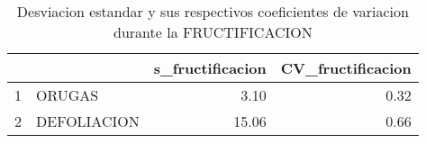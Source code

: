 \begin{table}[ht]
\centering
\begin{tabular}{rlrr}
  \hline
 &  & s\_fructificacion & CV\_fructificacion \\ 
  \hline
1 & ORUGAS & 3.10 & 0.32 \\ 
  2 & DEFOLIACION & 15.06 & 0.66 \\ 
   \hline
\end{tabular}
\caption{Desviacion estandar y sus
               respectivos coeficientes de variacion
               durante la FRUCTIFICACION} 
\label{table:stdDevs_fru}
\end{table}
